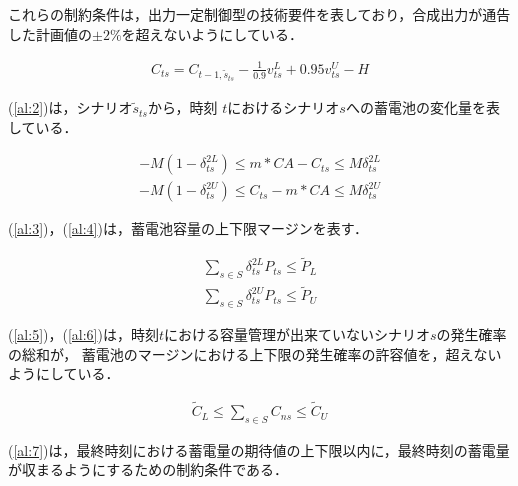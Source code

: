 \documentclass[a4paper,10pt]{jarticle}
\begin{document}
これらの制約条件は，出力一定制御型の技術要件を表しており，合成出力が通告した計画値の$\pm2\%$を超えないようにしている．

\vspace{-2mm}
\begin{spacing}{0.6}
\begin{align}
C_{ts} = C_{t-1,\tilde{s}_{ts}} - \frac{1}{0.9} v^L_{ts} + 0.95 v^U_{ts} - H
\label{al:2}
\end{align}
\end{spacing}

(\ref{al:2})は，シナリオ$\tilde{s}_{ts}$から，時刻 $t$におけるシナリオ$s$への蓄電池の変化量を表している．

\begin{spacing}{0.6}
\begin{align}
- M (1 - \delta^{2L}_{ts}) \le m * CA - C_{ts} \le M \delta^{2L}_{ts}
\label{al:3}
\end{align}
\begin{align}
- M (1 - \delta^{2U}_{ts}) \le C_{ts} - m * CA \le M \delta^{2U}_{ts}
\label{al:4}
\end{align}
\end{spacing}

(\ref{al:3})，(\ref{al:4})は，蓄電池容量の上下限マージンを表す．

\begin{spacing}{0.6}
\begin{align}
\sum_{s \in S} \delta^{2L}_{ts} P_{ts} \le \tilde{P}_L
\label{al:5}
\end{align}
\begin{align}
\sum_{s \in S} \delta^{2U}_{ts} P_{ts} \le \tilde{P}_U
\label{al:6}
\end{align}
\end{spacing}

(\ref{al:5})，(\ref{al:6})は，時刻$t$における容量管理が出来ていないシナリオ$s$の発生確率の総和が，
蓄電池のマージンにおける上下限の発生確率の許容値を，超えないようにしている．

\begin{spacing}{0.6}
\begin{align}
\tilde{C}_L \le \sum_{s \in S} C_{ns} \le \tilde{C}_U
\label{al:7}
\end{align}
\end{spacing}

(\ref{al:7})は，最終時刻における蓄電量の期待値の上下限以内に，最終時刻の蓄電量が収まるようにするための制約条件である．

\vspace{-4mm}
\end{document}
